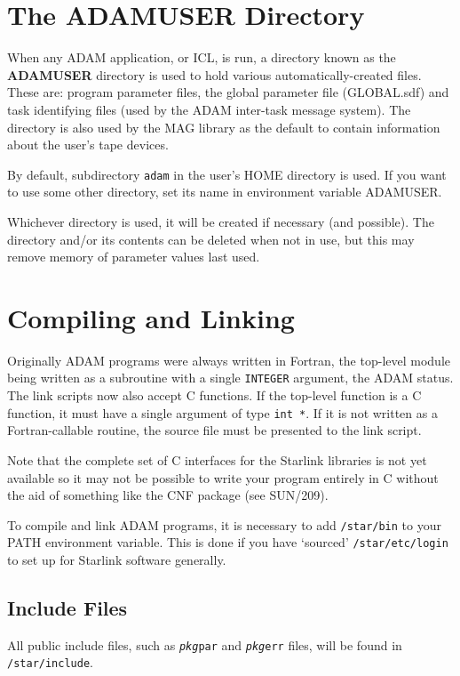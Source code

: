 \documentclass[twoside,11pt]{article}
\newcommand{\htmlref}[2]{#1}
\newcommand{\latex}[1]{#1}
\newcommand{\xref}[3]{#1}
\newcommand{\xlabel}[1]{}
\renewcommand{\_}{\texttt{\symbol{95}}}
\begin{document}
\section{\xlabel{the_adam_user_directory}\xlabel{ADAM_USER_directory}
\label{adam_user}The ADAM\_USER Directory}
When any ADAM application, or 
\xref{ICL}{sg5}{},
is run, a directory known as the
{\bf ADAM\_USER} directory is used to hold various automatically-created files.
These are: program parameter files, the global parameter file (GLOBAL.sdf) 
and task identifying files (used by the ADAM inter-task message system).
The directory is also used by the 
\xref{MAG}{sun171}{} library as the default to contain 
information about the user's tape devices.

By default, subdirectory \texttt{adam} in the user's HOME directory
is used. If you want to use some other directory, set its name in
environment variable ADAM\_USER. 

Whichever directory is used, it will be created if necessary (and possible).
The directory and/or its contents can be deleted when not in use, but this
may remove memory of parameter values last used.

\section{\xlabel{compiling_and_linking}Compiling and Linking}
Originally ADAM programs were always written in Fortran, the top-level module
being written as a subroutine with a single \texttt{INTEGER} argument, the
ADAM status.
The 
\htmlref{link scripts}{link_scripts}
now also accept C functions. If the top-level function is a C function, it
must have a single argument of type \texttt{int *}. If it is not written as a
Fortran-callable routine, the source file must be presented to the link script.

Note that the complete set of C interfaces for the Starlink libraries
is not yet available so it may not be possible to write your program entirely
in C without the aid of something like the 
\xref{CNF package}{sun209}{}\latex{ (see SUN/209)}.

To compile and link ADAM programs, it is necessary to add \texttt{/star/bin} to 
your PATH environment variable. This is done if you have `sourced'
\texttt{/star/etc/login} to set up for Starlink software generally. 

\subsection{\xlabel{include_files}\label{incs}Include Files}
All public include files, such as \texttt{\textit{pkg}\_par} and
\texttt{\textit{pkg}\_err} files, will be found in \texttt{/star/include}.
\end{document}
